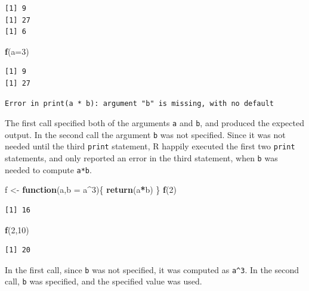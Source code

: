 \documentclass[
]{krantz}
\makeatletter
\newenvironment{Shaded}{\begin{snugshade}}{\end{snugshade}}
\newcommand{\ControlFlowTok}[1]{\textcolor[rgb]{0.27,0.27,0.27}{\textbf{#1}}}
\newcommand{\DataTypeTok}[1]{\textcolor[rgb]{0.27,0.27,0.27}{#1}}
\newcommand{\DecValTok}[1]{\textcolor[rgb]{0.06,0.06,0.06}{#1}}
\newcommand{\KeywordTok}[1]{\textcolor[rgb]{0.27,0.27,0.27}{\textbf{#1}}}
\newcommand{\NormalTok}[1]{#1}
\newcommand{\OperatorTok}[1]{\textcolor[rgb]{0.43,0.43,0.43}{\textbf{#1}}}
\newcommand{\StringTok}[1]{\textcolor[rgb]{0.5,0.5,0.5}{#1}}
\newenvironment{kframe}{%
\medskip{}
\setlength{\fboxsep}{.8em}
 \def\at@end@of@kframe{}%
 \ifinner\ifhmode%
  \def\at@end@of@kframe{\end{minipage}}%
  \begin{minipage}{\columnwidth}%
 \fi\fi%
 \def\FrameCommand##1{\hskip\@totalleftmargin \hskip-\fboxsep
 \colorbox{shadecolor}{##1}\hskip-\fboxsep
     \hskip-\linewidth \hskip-\@totalleftmargin \hskip\columnwidth}%
 \MakeFramed {\advance\hsize-\width
   \@totalleftmargin\z@ \linewidth\hsize
   \@setminipage}}%
 {\par\unskip\endMakeFramed%
 \at@end@of@kframe}
\renewenvironment{Shaded}{\begin{kframe}}{\end{kframe}}
\makeatother
\begin{document}
\begin{verbatim}
[1] 9
[1] 27
[1] 6
\end{verbatim}

\begin{Shaded}
\begin{Highlighting}[]
\KeywordTok{f}\NormalTok{(}\DataTypeTok{a=}\DecValTok{3}\NormalTok{)}
\end{Highlighting}
\end{Shaded}

\begin{verbatim}
[1] 9
[1] 27
\end{verbatim}

\begin{verbatim}
Error in print(a * b): argument "b" is missing, with no default
\end{verbatim}

The first call specified both of the arguments \texttt{a} and \texttt{b}, and produced the expected output. In the second call the argument \texttt{b} was not specified. Since it was not needed until the third \texttt{print} statement, R happily executed the first two \texttt{print} statements, and only reported an error in the third statement, when \texttt{b} was needed to compute \texttt{a*b}.

\begin{Shaded}
\begin{Highlighting}[]
\NormalTok{f \textless{}{-}}\StringTok{ }\ControlFlowTok{function}\NormalTok{(a,}\DataTypeTok{b =}\NormalTok{ a}\OperatorTok{\^{}}\DecValTok{3}\NormalTok{)\{}
    \KeywordTok{return}\NormalTok{(a}\OperatorTok{*}\NormalTok{b)}
\NormalTok{\}}
\KeywordTok{f}\NormalTok{(}\DecValTok{2}\NormalTok{)}
\end{Highlighting}
\end{Shaded}

\begin{verbatim}
[1] 16
\end{verbatim}

\begin{Shaded}
\begin{Highlighting}[]
\KeywordTok{f}\NormalTok{(}\DecValTok{2}\NormalTok{,}\DecValTok{10}\NormalTok{)}
\end{Highlighting}
\end{Shaded}

\begin{verbatim}
[1] 20
\end{verbatim}

In the first call, since \texttt{b} was not specified, it was computed as \texttt{a\^{}3}. In the second call, \texttt{b} was specified, and the specified value was used.
\end{document}
